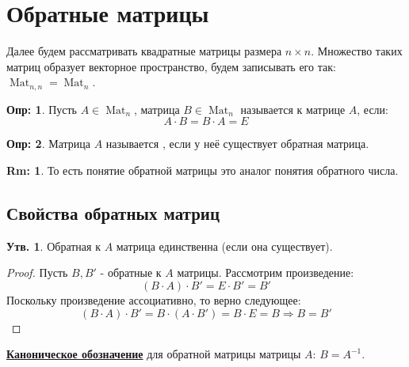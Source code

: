 \documentclass[12pt]{article}
\theoremstyle{definition}
\newtheorem{defn}{Опр:}
\newtheorem{rem}{Rm:}
\newtheorem{prop}{Утв.}
\newcommand{\matsq}[1]{\operatorname{Mat}_{#1}}
\newcommand{\mat}[2]{\operatorname{Mat}_{#1, #2}}
\begin{document}
\section*{Обратные матрицы}
Далее будем рассматривать квадратные матрицы размера $n \times n$. Множество таких матриц образует векторное пространство, будем записывать его так: $\mat{n}{n} = \matsq{n}$.
\begin{defn}
	Пусть $A \in \matsq{n}$, матрица $B \in \matsq{n}$ называется  к матрице $A$, если:
	$$
		A{\cdot}B = B{\cdot}A = E
	$$
\end{defn}
\begin{defn}
	Матрица $A$ называется , если у неё существует обратная матрица.
\end{defn}
\begin{rem}
	То есть понятие обратной матрицы это аналог понятия обратного числа.
\end{rem}

\subsection*{Свойства обратных матриц}
\begin{prop}
	Обратная к $A$ матрица единственна (если она существует).
\end{prop}
\begin{proof}
	Пусть $B, B'$ - обратные к $A$ матрицы. Рассмотрим произведение:
	$$
		(B{\cdot}A){\cdot}B' = E{\cdot}B' = B'
	$$
	Поскольку произведение ассоциативно, то верно следующее:
	$$
		(B{\cdot}A){\cdot}B' = B{\cdot}(A{\cdot}B') = B{\cdot}E = B \Rightarrow B = B'
	$$
\end{proof}
\uline{\textbf{Каноническое обозначение}} для обратной матрицы матрицы $A$: $B = A^{-1}$.
\end{document}
